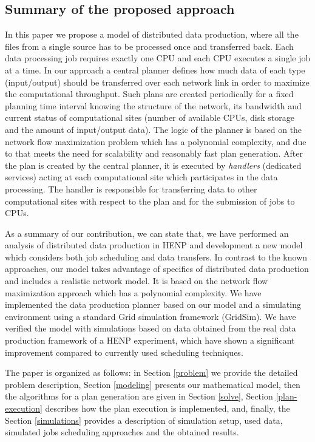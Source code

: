 \documentclass{svjour3}                     %
\begin{document}
\subsection{Summary of the proposed approach}
In this paper we propose a model of distributed data production, where all the files from a single source has to be processed once and transferred back. Each data processing job requires exactly one CPU and each CPU executes a single job at a time. In our approach a central planner defines how much data of each type (input/output) should be transferred over each network link in order to maximize the computational throughput. Such plans are created periodically for a fixed planning time interval knowing the structure of the network, its bandwidth and current status of computational sites (number of available CPUs, disk storage and the amount of input/output data). The logic of the planner is based on the network flow maximization problem which has a polynomial complexity, and due to that meets the need for scalability and reasonably fast plan generation. After the plan is created by the central planner, it is executed by \textit{handlers} (dedicated services) acting at each computational site which participates in the data processing. The handler is responsible for transferring data to other computational sites with respect to the plan and for the submission of jobs to CPUs. 
 
As a summary of our contribution, we can state that, we have performed an analysis of distributed data production in HENP and development a new model which considers both job scheduling and data transfers. In contrast to the known approaches, our model takes advantage of specifics of distributed data production and includes a realistic network model. It is based on the network flow maximization approach which has a polynomial complexity. We have implemented the data production planner based on our model and a simulating environment using a standard Grid simulation framework (GridSim). We have verified the model with simulations based on data obtained from the real data production framework of a HENP experiment, which have shown a significant improvement compared to currently used scheduling techniques. 

\hfill 

The paper is organized as follows: in Section \ref{problem} we provide the detailed problem description, Section \ref{modeling} presents our mathematical model, then the algorithms for a plan generation are given in Section \ref{solve}, Section \ref{plan-execution} describes how the plan execution is implemented, and, finally, the Section \ref{simulations} provides a description of simulation setup, used data, simulated jobs scheduling approaches and the obtained results. 
\end{document}
